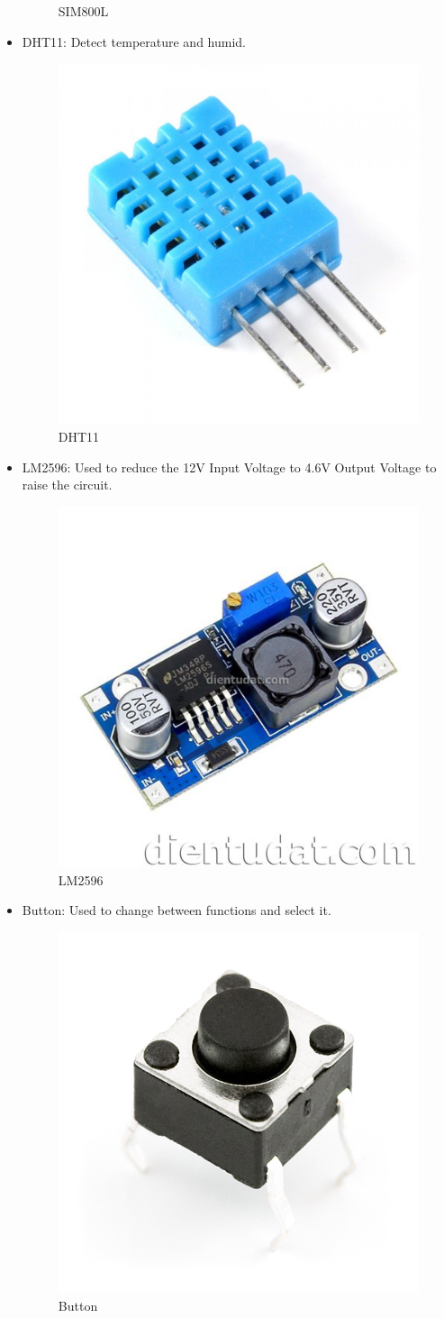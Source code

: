 \documentclass[12pt, a4paper, oneside]{article}
\begin{document}
\begin{itemize}
\begin{figure}[H]
		\caption{SIM800L}
		\label{fig:ModelSim and De2i-150 board}
	\end{figure}
	\item DHT11:\quad
	Detect temperature and humid.
	\begin{figure}[H]
		\centering
		\includegraphics[width=0.35\linewidth]{DHT}
		\caption{DHT11}
		\label{fig:ModelSim and De2i-150 board}
	\end{figure}
	\item LM2596:\quad
	Used to reduce the 12V Input Voltage to 4.6V Output Voltage to raise the circuit.
	\begin{figure}[H]
		\centering
		\includegraphics[width=0.4\linewidth]{LM2569}
		\caption{LM2596}
		\label{fig:ModelSim and De2i-150 board}
	\end{figure}
	\item Button: \quad Used to change between functions and select it.
	 \begin{figure}[H]
	 	\centering
	 	\includegraphics[width=0.3\linewidth]{button.jpg}
	 	\caption{Button}
	 	\label{fig:ModelSim and De2i-150 board}
	 \end{figure}
	  
\end{itemize}
\end{document}
